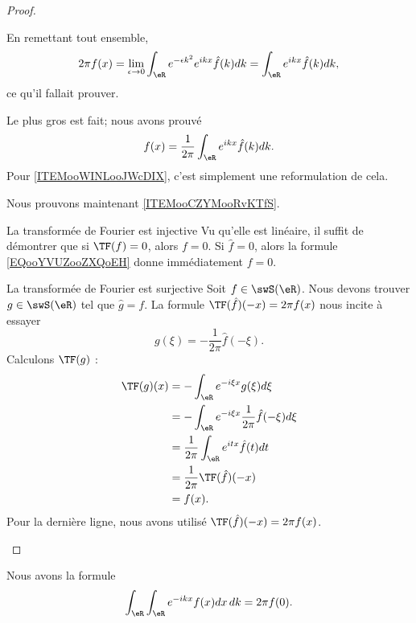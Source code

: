 \begin{proof}
\begin{subproof}
		En remettant tout ensemble,
		\begin{equation}
			2\pi f(x)=\lim_{\epsilon\to 0}\int_{\eR} e^{-\epsilon k^2} e^{ikx}\hat f(k)dk=\int_{\eR} e^{ikx}\hat f(k)dk,
		\end{equation}
		ce qu'il fallait prouver.
	\end{subproof}

	Le plus gros est fait; nous avons prouvé
	\begin{equation}        \label{EQooYVUZooZXQoEH}
		f(x)=\frac{1}{ 2\pi }\int_{\eR} e^{ikx}\hat f(k)dk.
	\end{equation}
	Pour \ref{ITEMooWINLooJWcDIX}, c'est simplement une reformulation de cela.

	Nous prouvons maintenant \ref{ITEMooCZYMooRvKTfS}.

	\begin{subproof}
		\item[La transformée de Fourier est injective]
		Vu qu'elle est linéaire, il suffit de démontrer que si \( \TF(f)=0\), alors \( f=0\). Si \( \hat f=0\), alors la formule \eqref{EQooYVUZooZXQoEH} donne immédiatement \( f=0\).
		\item[La transformée de Fourier est surjective]
		Soit \( f\in \swS(\eR)\). Nous devons trouver \( g\in\swS(\eR)\) tel que \( \hat g=f\). La formule \( \TF(\hat f)(-x)=2\pi f(x)\) nous incite à essayer
		\begin{equation}
			g(\xi)=-\frac{1}{ 2\pi }\hat f(-\xi).
		\end{equation}
		Calculons \( \TF(g)\) :
		\begin{subequations}
			\begin{align}
				\TF(g)(x) & =-\int_{\eR} e^{-i\xi x}g(\xi)d\xi                       \\
				          & =-\int_{\eR} e^{-i\xi x}\frac{1}{ 2\pi }\hat f(-\xi)d\xi \\
				          & =\frac{1}{ 2\pi }\int_{\eR} e^{itx}\hat f(t)dt           \\
				          & =\frac{1}{ 2\pi }\TF(\hat f)(-x)                         \\
				          & =f(x).
			\end{align}
		\end{subequations}
		Pour la dernière ligne, nous avons utilisé \( \TF(\hat f)(-x)=2\pi f(x)\).
	\end{subproof}


\end{proof}

\begin{corollary}       \label{CORooAZLZooSviTej}
	Nous avons la formule
	\begin{equation}        \label{EQooRJXRooElEMAa}
		\int_{\eR}\int_{\eR} e^{-ikx}f(x)dx\,dk=2\pi f(0).
	\end{equation}
\end{corollary}

